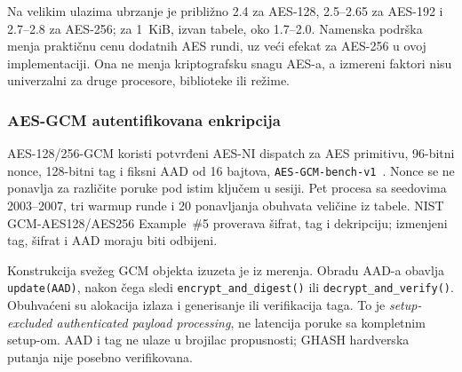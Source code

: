 Na velikim ulazima ubrzanje je približno 2.4 za AES-128, 2.5--2.65 za
AES-192 i 2.7--2.8 za AES-256; za 1~KiB, izvan tabele, oko 1.7--2.0.
Namenska podrška menja praktičnu cenu dodatnih AES rundi, uz veći efekat
za AES-256 u ovoj implementaciji. Ona ne menja kriptografsku snagu AES-a,
a izmereni faktori nisu univerzalni za druge procesore, biblioteke ili režime.

\subsubsection{AES-GCM autentifikovana enkripcija}
\label{sec:aes-gcm-metodologija}
\label{sec:rezultati-aes-gcm}
AES-128/256-GCM koristi potvrđeni AES-NI dispatch za AES primitivu,
96-bitni nonce, 128-bitni tag i fiksni AAD od 16 bajtova,
\texttt{AES-GCM-bench-v1}~\cite{sp800-38d}. Nonce se ne ponavlja za
različite poruke pod istim ključem u sesiji. Pet procesa sa seedovima
2003--2007, tri warmup runde i 20 ponavljanja obuhvata veličine iz tabele.
NIST GCM-AES128/AES256 Example~\#5 proverava šifrat, tag i dekripciju;
izmenjeni tag, šifrat i AAD moraju biti odbijeni.

Konstrukcija svežeg GCM objekta izuzeta je iz merenja. Obradu AAD-a
obavlja \texttt{update(AAD)}, nakon čega sledi
\texttt{encrypt\_\allowbreak and\_\allowbreak digest()} ili
\texttt{decrypt\_\allowbreak and\_\allowbreak verify()}.
Obuhvaćeni su alokacija izlaza i generisanje
ili verifikacija taga. To je \emph{setup-excluded authenticated payload
processing}, ne latencija poruke sa kompletnim setup-om. AAD i tag ne
ulaze u brojilac propusnosti; GHASH hardverska putanja nije posebno verifikovana.

